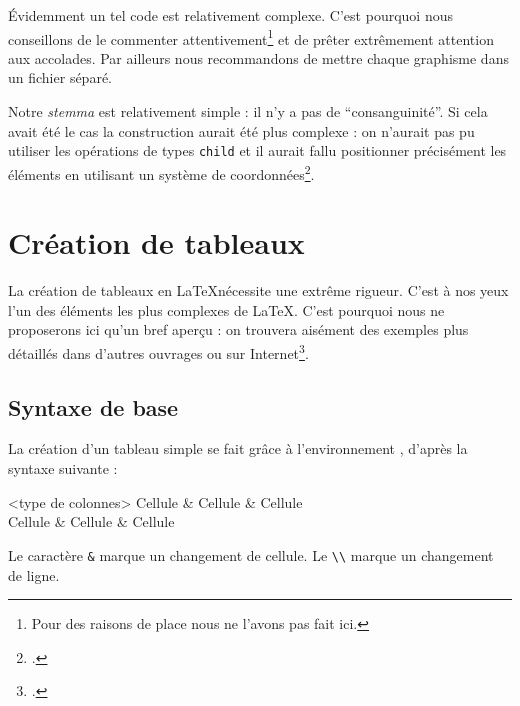 Évidemment un tel code est relativement complexe. C'est pourquoi nous conseillons de le commenter attentivement\footnote{Pour des raisons de place nous ne l'avons pas fait ici.} et de prêter extrêmement attention  aux accolades. Par ailleurs nous recommandons de mettre chaque graphisme  dans un fichier séparé.


Notre \emph{stemma} est relativement simple : il n'y a pas de \enquote{consanguinité}. Si cela avait été le cas la construction aurait été plus complexe : on n'aurait pas pu utiliser les opérations de types \verb|child| et il aurait fallu positionner précisément les éléments en utilisant un système de coordonnées\footcite[Nous avons publié sur notre site Internet une série d'articles sur les \emph{stemma} avec TikZ :][]{stemma}.



\section{Création de tableaux}

\begin{attention}
La création de tableaux en \LaTeX nécessite  une extrême rigueur. 
C'est à nos yeux l'un des éléments les plus complexes de \LaTeX. C'est pourquoi nous ne proposerons ici qu'un bref aperçu : on trouvera aisément des exemples plus détaillés dans d'autres ouvrages ou sur Internet\footcite[On pourra consulter des fichiers assez didactiques :][]{bebert_tableaux}.
\end{attention}

\subsection{Syntaxe de base}

La création d'un tableau simple se fait grâce à l'environnement , d'après la syntaxe suivante :

\begin{latexcode}
\begin{tabular}{<type de colonnes>}
    Cellule & Cellule & Cellule \\
    Cellule & Cellule & Cellule \\
\end{tabular}
\end{latexcode}

Le caractère \verb|&| marque un changement de cellule. Le \verb|\\| marque un changement de ligne.

